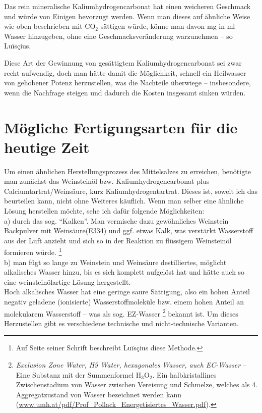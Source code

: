 \documentclass[a5paper,fontsize=10pt]{memoir}
\newcommand\ouncesofpound{12}
\newcommand\quentinsofounce{8}
\newcommand\gransofquentins{63}
\newcommand\gramsofpound{372}
\newcommand\gramofounce{\fpeval{\gramsofpound / \ouncesofpound}}
\newcommand\gramofgran{\fpeval{\gramsofpound / \ouncesofpound / \quentinsofounce / \gransofquentins}}
\begin{document}
\FPeval\x{round(16*\gramofounce:0)}%
\FPeval\x{round(3*\gramofgran*1000:0)}%
Das rein mineralische Kaliumhydrogencarbonat hat einen weicheren Geschmack 
und würde von Einigen bevorzugt werden. 
Wenn man dieses auf ähnliche Weise wie oben beschrieben 
mit CO$_2$ sättigen würde, 
könne man davon \numprint{\x} mg in \numprint{\a} ml Wasser hinzugeben, 
ohne eine Geschmacksveränderung warzunehmen 
-- so Luïsçius.

Diese Art der Gewinnung von gesättigtem Kaliumhydrogencarbonat 
sei zwar recht aufwendig, 
doch man hätte damit die Möglichkeit, 
schnell ein Heilwasser von gehobener Potenz herzustellen, 
was die Nachteile überwiege 
-- insbesondere, wenn die Nachfrage steigen
und dadurch die Kosten insgesamt sinken würden.


\section{Mögliche Fertigungsarten für die heutige Zeit}

Um einen ähnlichen Herstellungsprozess des Mittelsalzes zu erreichen, 
benötigte man zunächst das Weinsteinöl bzw. 
Kaliumhydrogencarbonat plus Calciumtartrat/Weinsäure, 
kurz Kaliumhydrogentartrat. 
Dieses ist, soweit ich das beurteilen kann, nicht ohne Weiteres käuflich. 
Wenn man selber eine ähnliche Lösung herstellen möchte, 
sehe ich dafür folgende Möglichkeiten:\\

a) durch das sog. ``Kalken''.
Man vermische dazu gewöhnliches Weinstein Backpulver
mit Weinsäure(E334) und ggf. etwas Kalk,
was verstärkt Wasserstoff aus der Luft anzieht
und sich so in der Reaktion
zu flüssigem Weinsteinöl formieren würde.%
\footnote{Auf Seite \pageref{whitewashing} seiner Schrift 
beschreibt Luïsçius diese Methode.}\\

b) man fügt so lange zu Weinstein und Weinsäure
destilliertes, möglicht alkalisches Wasser hinzu,
bis es sich komplett aufgelöst hat
und hätte auch so eine weinsteinölartige Lösung hergestellt.\\

Hoch alkalisches Wasser 
hat eine geringe saure Sättigung,
also ein hohen Anteil negativ geladene (ionisierte) Wasserstoffmoleküle 
bzw. einem hohen Anteil an molekularem Wasserstoff
-- was als sog. EZ-Wasser%
\footnote{\emph{Exclusion Zone Water, H9 Water, hexagonales Wasser, auch EC-Wasser}
  -- Eine Substanz mit der Summenformel H$_3$O$_2$.
  Ein halbkristallines Zwischenstadium von Wasser
  zwischen Vereisung und Schmelze,
  welches als 4. Aggregatzustand von Wasser bezeichnet werden kann
  (\href{https://www.umh.at/pdf/Prof_Pollack_Energetisiertes_Wasser.pdf}{www.umh.at/pdf/Prof\_Pollack\_Energetisiertes\_Wasser.pdf}).}
bekannt ist. 
Um dieses Herzustellen gibt es verschiedene technische 
und nicht-technische Varianten. 
\end{document}
